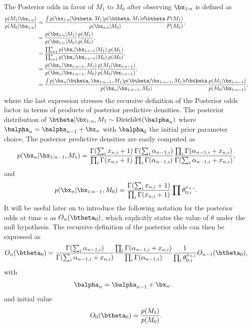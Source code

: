 \documentclass[11pt]{article}
\begin{document}
The Posterior odds in favor of $M_1$ to $M_0$ after observing $\bx_{1:n}$ is defined as
\begin{align}
  \label{eq:general_posterior_odds}
  \frac{p(M_1|\bx_{1:n})}{p(M_0|\bx_{1:n})}  &= \frac{\int p(\bx_{1:n}|\btheta,M_1)p(\btheta,M_1)d\btheta}{p(\bx_{1:n}|M_0)}\frac{P(M_1)}{P(M_0)},\\
                      &=\frac{p(\bx_{1:n}|M_1)}{p(\bx_{1:n}|M_0)}\frac{p(M_1)}{p(M_0)},\\
                      &=\frac{\prod_{i=1}^{n}p(\bx_i|\bx_{1:i-1}|M_1)}{\prod_{i=1}^{n}p(\bx_i|\bx_{1:i-1}|M_0)}\frac{p(M_1)}{p(M_0)},\\
                      &=\frac{p(\bx_n|\bx_{1:n-1},M_1)}{p(\bx_n|\bx_{1:n-1},M_0)} \frac{p(M_1|\bx_{1:n-1})}{p(M_0|\bx_{1:n-1})},\\
    &=\frac{\int p(\bx_n|\btheta,\bx_{1:n-1},M_1)p(\btheta|\bx_{1:n-1},M_1)d\btheta}{p(\bx_n|\bx_{1:n-1},M_0)}  \frac{p(M_1|\bx_{1:n-1})}{p(M_0|\bx_{1:n-1})} ,
\end{align}
where the last expression stresses the recursive definition of the Posterior odds factor in terms of products of posterior predictive densities.
The posterior distribution of $\btheta| \bx_{1:n}, M_1 \sim \text{Dirichlet}(\balpha_n)$ where $\balpha_n = \balpha_{n-1}+\bx_n$ with $\balpha_0$ the initial prior parameter choice.
The posterior predictive densities are easily computed as
\begin{equation}
  \label{eq:posterior_predictive_m1}
   p(\bx_n|\bx_{1:n-1},M_1) = \frac{ \Gamma(\sum_i x_{n,i}+ 1)}{\prod_i \Gamma(x_{n,i} + 1)} \frac{\Gamma(\sum_i \alpha_{n-1,i})}{\prod_i \Gamma(\alpha_{n-1,i})} \frac{\prod_i \Gamma(\alpha_{n-1,i} + x_{n,i})}{\Gamma(\sum_i \alpha_{n-1,i} + x_{n,i})},
\end{equation}
and
\begin{equation}
  \label{eq:posterior_predictive_m2}
   p(\bx_n|\bx_{1:n-1},M_0) = \frac{ \Gamma(\sum_i x_{n,i} + 1)}{\prod_i \Gamma(x_{n,i} + 1)} \prod \theta_{0,i}^{x_{n,i}}.
 \end{equation}
 It will be useful later on to introduce the following notation for the posterior odds at time $n$ as $O_n(\btheta_0)$, which explicitly states the value of $\theta$ under the null hypothesis.
The recursive definition of the posterior odds can then be expressed as
\begin{align}
  O_{n}(\btheta_0) &= \frac{\Gamma(\sum_i \alpha_{n-1,i})}{\Gamma(\sum_i \alpha_{n-1,i} +  x_{n,i})} \frac{\prod_i \Gamma(\alpha_{n-1,i} + x_{n,i})}{\prod_i \Gamma(\alpha_{n-1,i})} \frac{1}{\prod_i \theta_{0,i}^{x_{n,i}}}  O_{n-1}(\btheta_0),\\
\end{align}
with
\begin{align}
  \label{eq:alpha_update}
  \balpha_{n}&= \balpha_{n-1}+\bx_n.
\end{align}
and initial value
\begin{align}
  \label{eq:bayes_factor_seed}
O_0(\btheta_0) = \frac{p(M_1)}{p(M_0)}.
\end{align}
\end{document}
